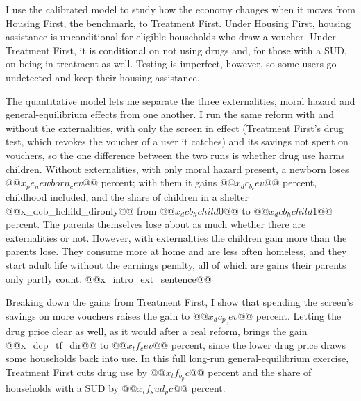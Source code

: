 \documentclass[10pt]{article}
\begin{document}
I use the calibrated model to study how the economy changes when it moves from Housing First, the benchmark, to Treatment First. Under Housing First, housing assistance is unconditional for eligible households who draw a voucher. Under Treatment First, it is conditional on not using drugs and, for those with a SUD, on being in treatment as well. Testing is imperfect, however, so some users go undetected and keep their housing assistance.

The quantitative model lets me separate the three externalities, moral hazard and general-equilibrium effects from one another. I run the same reform with and without the externalities, with only the screen in effect (Treatment First's drug test, which revokes the voucher of a user it catches) and its savings not spent on vouchers, so the one difference between the two runs is whether drug use harms children. Without externalities, with only moral hazard present, a newborn loses $@@x_pe_newborn_cev@@$ percent; with them it gains $@@x_dc_b_cev@@$ percent, childhood included, and the share of children in a shelter @@x_dcb_hchild_dironly@@ from $@@x_dcb_hchild0@@$ to $@@x_dcb_hchild1@@$ percent. The parents themselves lose about as much whether there are externalities or not.  However, with externalities the children gain more than the parents lose. They consume more at home and are less often homeless, and they start adult life without the earnings penalty, all of which are gains their parents only partly count.  @@x_intro_ext_sentence@@

Breaking down the gains from Treatment First, I show that spending the screen's savings on more vouchers raises the gain to $@@x_dc_p_cev@@$ percent. Letting the drug price clear as well, as it would after a real reform, brings the gain @@x_dcp_tf_dir@@ to $@@x_tf_cev@@$ percent, since the lower drug price draws some households back into use. In this full long-run general-equilibrium exercise, Treatment First cuts drug use by $@@x_tf_b_pc@@$ percent and the share of households with a SUD by $@@x_tf_sud_pc@@$ percent.
\end{document}
